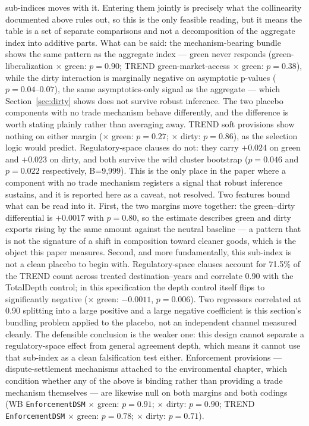 \documentclass[12pt]{article}
\begin{document}
sub-indices moves with it. Entering them jointly is precisely what the collinearity
documented above rules out, so this is the only feasible reading, but it means the table
is a set of separate comparisons and not a decomposition of the aggregate index into
additive parts. What can be said: the
mechanism-bearing bundle shows the same pattern as the aggregate index --- green never
responds (green-liberalization $\times$ green: $p=0.90$; TREND green-market-access
$\times$ green: $p=0.38$), while the dirty interaction is marginally negative on
asymptotic p-values ($p=0.04$--$0.07$), the same asymptotics-only signal as the
aggregate --- which Section~\ref{sec:dirty} shows does not survive robust inference. The
two placebo components with no trade mechanism behave differently, and the difference is
worth stating plainly rather than averaging away. TREND soft provisions show nothing on
either margin ($\times$ green: $p=0.27$; $\times$ dirty: $p=0.86$), as the selection
logic would predict. Regulatory-space clauses do not: they carry $+0.024$ on green and
$+0.023$ on dirty, and both survive the wild cluster bootstrap ($p=0.046$ and $p=0.022$
respectively, B=9{,}999). This is the only place in the paper where a component with no
trade mechanism registers a signal that robust inference sustains, and it is reported
here as a caveat, not resolved. Two features bound what can be read into it. First, the
two margins move together: the green--dirty differential is $+0.0017$ with $p=0.80$, so
the estimate describes green and dirty exports rising by the same amount against the
neutral baseline --- a pattern that is not the signature of a shift in composition toward
cleaner goods, which is the object this paper measures. Second, and more fundamentally,
this sub-index is not a clean placebo to begin with. Regulatory-space clauses account for
71.5\% of the TREND count across treated destination--years and correlate 0.90 with the
TotalDepth control; in this specification the depth control itself flips to significantly
negative ($\times$ green: $-0.0011$, $p=0.006$). Two regressors correlated at 0.90
splitting into a large positive and a large negative coefficient is this section's
bundling problem applied to the placebo, not an independent channel measured cleanly. The
defensible conclusion is the weaker one: this design cannot separate a regulatory-space
effect from general agreement depth, which means it cannot use that sub-index as a clean
falsification test either. Enforcement provisions --- dispute-settlement
mechanisms attached to the environmental chapter, which condition whether any of the
above is binding rather than providing a trade mechanism themselves --- are likewise
null on both margins and both codings (WB \texttt{EnforcementDSM} $\times$ green:
$p=0.91$; $\times$ dirty: $p=0.90$; TREND \texttt{EnforcementDSM} $\times$ green:
$p=0.78$; $\times$ dirty: $p=0.71$).
\end{document}
